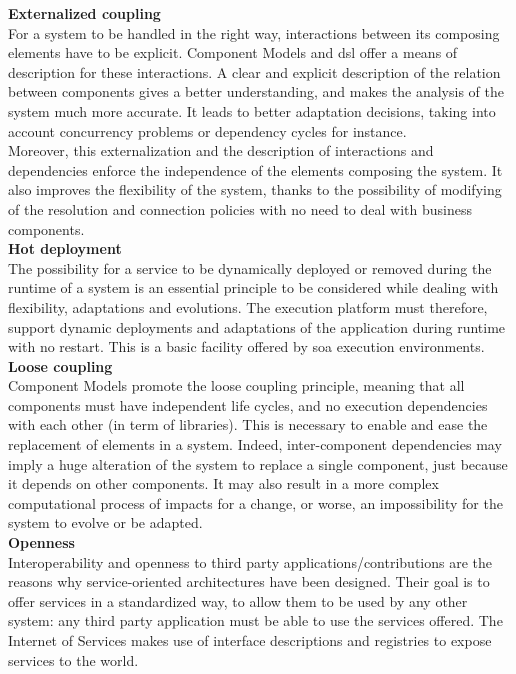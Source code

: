 {\bf Externalized coupling}\\
For a system to be handled in the right way, interactions between its composing elements have to be explicit. Component Models and \gls{dsl} offer a means of description for these interactions. A clear and explicit description of the relation between components gives a better understanding, and makes the analysis of the system much more accurate. It leads to better adaptation decisions, taking into account concurrency problems or dependency cycles for instance.\\
Moreover, this externalization and the description of interactions and dependencies enforce the independence of the elements composing the system. It also improves the flexibility of the system, thanks to the possibility of modifying of the resolution and connection policies with no need to deal with business components.\\

{\bf Hot deployment}\\
The possibility for a service to be dynamically deployed or removed during the runtime of a system is an essential principle to be considered while dealing with flexibility, adaptations and evolutions. The execution platform must therefore, support dynamic deployments and adaptations of the application during runtime with no restart. This is a basic facility offered by \gls{soa} execution environments.\\

{\bf Loose coupling}\\
Component Models promote the loose coupling principle, meaning that all components must have independent life cycles, and no execution dependencies with each other (in term of libraries). This is necessary to enable and ease the replacement of elements in a system. Indeed, inter-component dependencies may imply a huge alteration of the system to replace a single component, just because it depends on other components. It may also result in a more complex computational process of impacts for a change, or worse, an impossibility for the system to evolve or be adapted.\\

{\bf Openness}\\
Interoperability and openness to third party applications/contributions are the reasons why service-oriented architectures have been designed. Their goal is to offer services in a standardized way, to allow them to be used by any other system: any third party application must be able to use the services offered. The Internet of Services makes use of interface descriptions and registries to expose services to the world.


